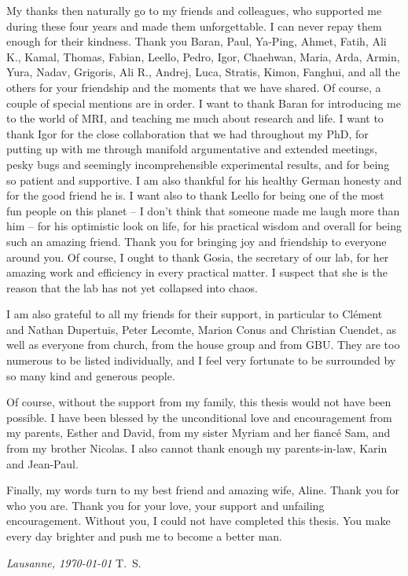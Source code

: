 My thanks then naturally go to my friends and colleagues, who supported me during these four years and made them unforgettable. I can never repay them enough for their kindness. Thank you Baran, Paul, Ya-Ping, Ahmet, Fatih, Ali K., Kamal, Thomas, Fabian, Leello, Pedro, Igor, Chaehwan, Maria, Arda, Armin, Yura, Nadav, Grigoris, Ali R., Andrej, Luca, Stratis, Kimon, Fanghui, and all the others for your friendship and the moments that we have shared. Of course, a couple of special mentions are in order.
I want to thank Baran for introducing me to the world of MRI, and teaching me much about research and life.
I want to thank Igor for the close collaboration that we had throughout my PhD, for putting up with me through manifold argumentative and extended meetings, pesky bugs and seemingly incomprehensible experimental results, and for being so patient and supportive. I am also thankful for his healthy German honesty and for the good friend he is. %
I want also to thank Leello for being one of the most fun people on this planet -- I don't think that someone made me laugh more than him --  for his optimistic
look on life, for his practical wisdom and overall for being such an amazing friend. Thank you for bringing joy and friendship to everyone around you. 
Of course, I ought to thank Gosia, the secretary of our lab, for her amazing work and efficiency in every practical matter. I suspect that she is the reason that the lab has not yet collapsed into chaos.
\vspace{0.5cm}

I am also grateful to all my friends for their support, in particular to Clément and Nathan Dupertuis, Peter Lecomte, Marion Conus and Christian Cuendet, as well as everyone from church, from the house group and from GBU. They are too numerous to be listed individually, and I feel very fortunate to be surrounded by so many kind and generous people.
\vspace{0.5cm}

Of course, without the support from my family, this thesis would not have been possible. I have been blessed by the unconditional love and encouragement from my parents, Esther and David, from my sister Myriam and her fiancé Sam, and from my brother Nicolas. I also cannot thank enough my parents-in-law, Karin and Jean-Paul.

\vspace{0.5cm}
Finally, my words turn to my best friend and amazing wife, Aline. Thank you for who you are. Thank you for your love, your support and unfailing encouragement. Without you, I could not have completed this thesis. You make every day brighter and push me to become a better man. 


\vspace{0.5cm}

\noindent\textit{Lausanne, \today}
\hfill T.~S.
